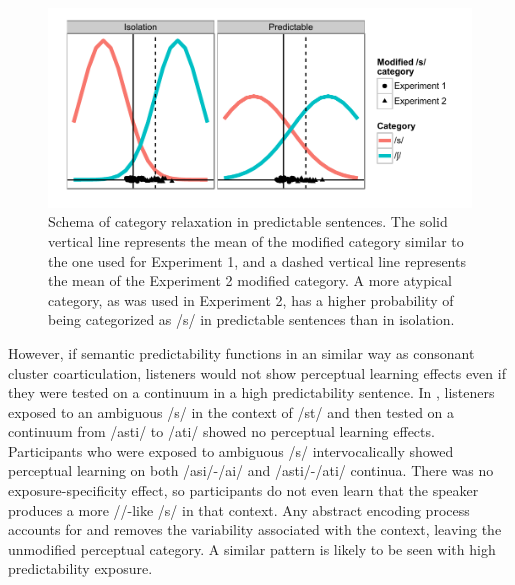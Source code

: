 \begin{figure}[!ht]
\centering
\caption{Schema of category relaxation in predictable sentences.  The solid vertical line represents the mean of the modified category similar to the one used for Experiment 1, and a dashed vertical line represents the mean of the Experiment 2 modified category.  A more atypical category, as was used in Experiment 2, has a higher probability of being categorized as /s/ in predictable sentences than in isolation.}
\label{fig:distPred}
\begin{center}
\includegraphics[width=\textwidth]{graphs/distPred}
\end{center}
\end{figure}

However, if semantic predictability functions in an similar way as consonant cluster coarticulation, listeners would not show perceptual learning effects even if they were tested on a continuum in a high predictability sentence.
In \citet{Kraljic2008a}, listeners exposed to an ambiguous /s/ in the context of /st\textturnr/ and then tested on a continuum from /ast\textturnr i/ to /a\textesh t\textturnr i/ showed no perceptual learning effects.
Participants who were exposed to ambiguous /s/ intervocalically showed perceptual learning on both /asi/-/a\textesh i/ and /ast\textturnr i/-/a\textesh t\textturnr i/ continua.
There was no exposure-specificity effect, so participants do not even learn that the speaker produces a more /\textesh/-like /s/ in that context.
Any abstract encoding process accounts for and removes the variability associated with the context, leaving the unmodified perceptual category.
A similar pattern is likely to be seen with high predictability exposure.

